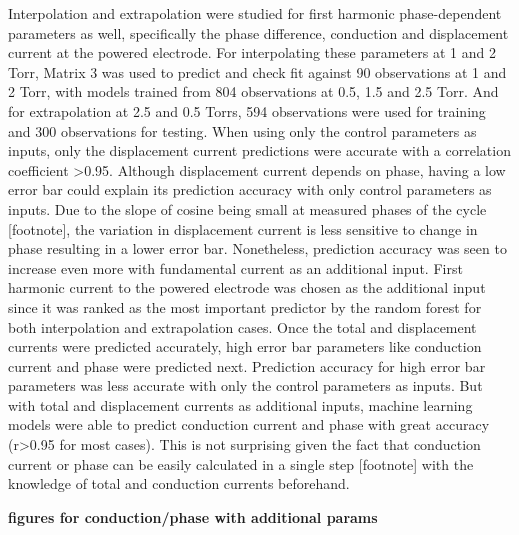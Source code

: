 \documentclass[12pt]{iopart}
\begin{document}
Interpolation and extrapolation were studied for first harmonic phase-dependent parameters as well, specifically the phase difference, conduction and displacement current at the powered electrode. For interpolating these parameters at 1 and 2 Torr, Matrix 3 was used to predict and check fit against 90 observations at 1 and 2 Torr, with models trained from 804 observations at 0.5, 1.5 and 2.5 Torr. And for extrapolation at 2.5 and 0.5 Torrs, 594 observations were used for training and 300 observations for testing. When using only the control parameters as inputs, only the displacement current predictions were accurate with a correlation coefficient >0.95. Although displacement current depends on phase, having a low error bar could explain its prediction accuracy with only control parameters as inputs. Due to the slope of cosine being small at measured phases of the cycle [footnote], the variation in displacement current is less sensitive to change in phase resulting in a lower error bar. Nonetheless, prediction accuracy was seen to increase even more with fundamental current as an additional input. First harmonic current to the powered electrode was chosen as the additional input since it was ranked as the most important predictor by the random forest for both interpolation and extrapolation cases. Once the total and displacement currents were predicted accurately, high error bar parameters like conduction current and phase were predicted next. Prediction accuracy for high error bar parameters was less accurate with only the control parameters as inputs. But with total and displacement currents as additional inputs, machine learning models were able to predict conduction current and phase with great accuracy (r>0.95 for most cases). This is not surprising given the fact that conduction current or phase can be easily calculated in a single step [footnote] with the knowledge of total and conduction currents beforehand.


\textbf{figures for conduction/phase with additional params}
\end{document}

